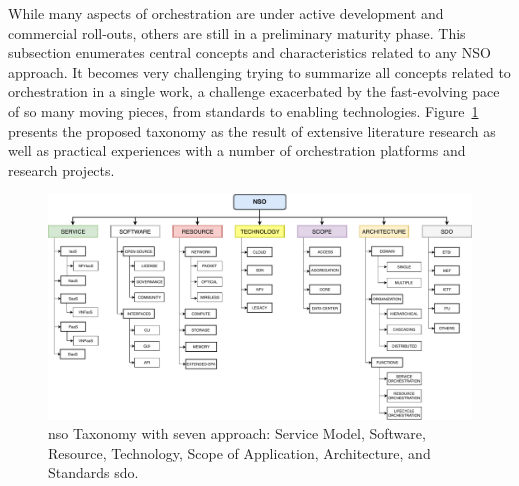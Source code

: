 While many aspects of orchestration are under active development and commercial roll-outs, others are still in a preliminary maturity phase. This subsection enumerates central concepts and characteristics related to any NSO approach. It becomes very challenging trying to summarize all concepts related to orchestration in a single work, a challenge exacerbated by the fast-evolving pace of so many moving pieces, from standards to enabling technologies. Figure~\ref{tax} presents the proposed taxonomy as the result of extensive literature research as well as practical experiences with a number of orchestration platforms and research projects.   

\begin{figure}[thpb]
  \centering
  \includegraphics[scale=.51]{Figures/04_NSO/taxonomy}
    \caption{\gls{nso} Taxonomy with seven approach: Service Model, Software, Resource, Technology, Scope of Application, Architecture, and Standards \acrfull{sdo}.}
    \label{tax}
\end{figure}

